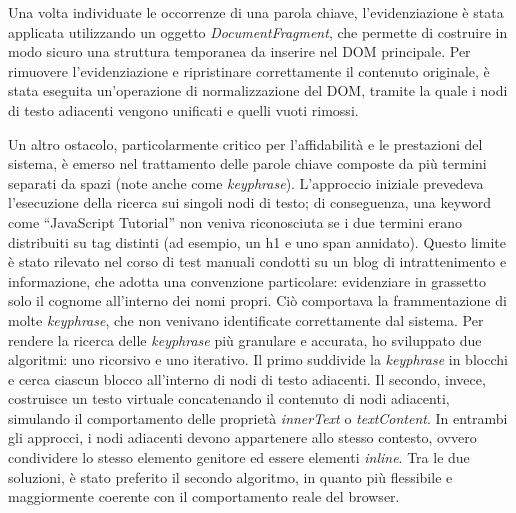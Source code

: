 \vspace{10pt}
\par\noindent Una volta individuate le occorrenze di una parola chiave, l’evidenziazione è stata applicata utilizzando un oggetto \textit{DocumentFragment}, che permette di costruire in modo sicuro una struttura temporanea da inserire nel DOM principale. Per rimuovere l’evidenziazione e ripristinare correttamente il contenuto originale, è stata eseguita un’operazione di normalizzazione del DOM, tramite la quale i nodi di testo adiacenti vengono unificati e quelli vuoti rimossi.

\vspace{10pt}
\par\noindent Un altro ostacolo, particolarmente critico per l’affidabilità e le prestazioni del sistema, è emerso nel trattamento delle parole chiave composte da più termini separati da spazi (note anche come \textit{keyphrase}). L’approccio iniziale prevedeva l’esecuzione della ricerca sui singoli nodi di testo; di conseguenza, una keyword come “JavaScript Tutorial” non veniva riconosciuta se i due termini erano distribuiti su tag distinti (ad esempio, un h1 e uno span annidato). Questo limite è stato rilevato nel corso di test manuali condotti su un blog di intrattenimento e informazione, che adotta una convenzione particolare: evidenziare in grassetto solo il cognome all’interno dei nomi propri. Ciò comportava la frammentazione di molte \textit{keyphrase}, che non venivano identificate correttamente dal sistema. Per rendere la ricerca delle \textit{keyphrase} più granulare e accurata, ho sviluppato due algoritmi: uno ricorsivo e uno iterativo. Il primo suddivide la \textit{keyphrase} in blocchi e cerca ciascun blocco all’interno di nodi di testo adiacenti. Il secondo, invece, costruisce un testo virtuale concatenando il contenuto di nodi adiacenti, simulando il comportamento delle proprietà \textit{innerText} o \textit{textContent}. In entrambi gli approcci, i nodi adiacenti devono appartenere allo stesso contesto, ovvero condividere lo stesso elemento genitore ed essere elementi \textit{inline}. Tra le due soluzioni, è stato preferito il secondo algoritmo, in quanto più flessibile e maggiormente coerente con il comportamento reale del browser.

